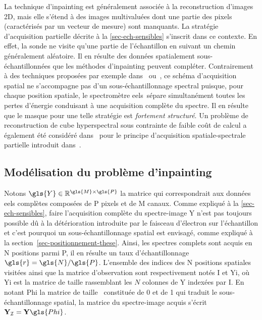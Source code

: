 La technique d'inpainting est généralement associée à la reconstruction d'images 2D, mais elle s'étend à des images multivaluées dont une partie des pixels (caractérisés par un vecteur de mesure) sont manquants.
%
La stratégie d'acquisition partielle décrite à la \cref{sec-ech-sensibles} s'inscrit dans ce contexte. En effet, la sonde ne visite qu'une partie de l'échantillon en suivant un chemin généralement aléatoire. Il en résulte des données spatialement sous-échantillonnées que les méthodes d'inpainting peuvent compléter.
%
Contrairement à des techniques proposées par exemple dans~\cite{gehm2007single} ou~\cite{mcgregor2015adaptive}, ce schéma d'acquisition spatial ne s'accompagne pas d'un sous-échantillonnage spectral puisque, pour chaque position spatiale, le spectromètre \gls{eels} sépare simultanément toutes les pertes d'énergie conduisant à une acquisition complète du spectre. Il en résulte que le masque pour une telle stratégie est \emph{fortement structuré}.
%
Un problème de reconstruction de cube hyperspectral sous contrainte de faible coût de calcul a également été considéré dans~\cite{ardi2018fast} pour le principe d'acquisition spatiale-spectrale partielle introduit dans~\cite{mcgregor2015adaptive}.


\subsection{Modélisation du problème d'inpainting}\label{subsec-direct-inverse-problem}

Notons $\gls{Y}\in\mathbb{R}^{\gls{M}\times\gls{P}}$ la matrice qui correspondrait aux données \gls{eels} complètes composées de \gls{P} pixels et de \gls{M} canaux. 
%
Comme expliqué à la \cref{sec-ech-sensibles}, faire l'acquisition complète du spectre-image \gls{Y} n'est pas toujours possible dû à la détérioration introduite par le faisceau d'électron sur l'échantillon et c'est pourquoi un sous-échantillonnage spatial est envisagé, comme expliqué à la section~\ref{sec-positionnement-these}.
%
Ainsi, les spectres complets sont acquis en \gls{N} positions parmi \gls{P}, il en résulte un taux d'échantillonnage $\gls{r}=\gls{N}/\gls{P}$. L'ensemble des indices des \gls{N} positions spatiales visitées ainsi que la matrice d'observation sont respectivement notés \gls{I} et \gls{Yi}, où \gls{Yi} est la matrice de taille  rassemblant les $N$ colonnes de \gls{Y} indexées par \gls{I}. En notant \gls{Phi} la matrice de taille  constituée de 0 et de 1 qui traduit le sous-échantillonnage spatial, la matrice du spectre-image acquis s'écrit $\mathbf{Y}_{\mathcal{I}}=\mathbf{Y} \gls{Phi}$.%

